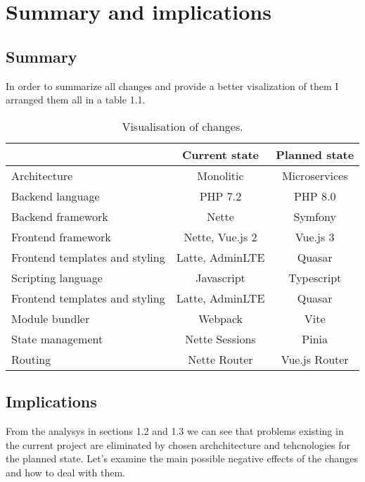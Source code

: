 \section{Summary and implications}

\subsection{Summary} 
In order to summarize all changes and provide a better visalization of them I arranged them all in a table 1.1.

\begin{table}[h]
\begin{tabular}{l|c|c|}
\textbf{}                                            & \textbf{Current state} & \textbf{Planned state} \\ \hline
\multicolumn{1}{|l|}{Architecture}                   & Monolitic              & Microservices          \\ \hline
\multicolumn{1}{|l|}{Backend language}               & PHP 7.2                & PHP 8.0                \\ \hline
\multicolumn{1}{|l|}{Backend framework}              & Nette                  & Symfony                \\ \hline
\multicolumn{1}{|l|}{Frontend framework}             & Nette, Vue.js 2        & Vue.js 3               \\ \hline
\multicolumn{1}{|l|}{Frontend templates and styling} & Latte, AdminLTE        & Quasar                 \\ \hline
\multicolumn{1}{|l|}{Scripting language}             & Javascript             & Typescript             \\ \hline
\multicolumn{1}{|l|}{Frontend templates and styling} & Latte, AdminLTE        & Quasar                 \\ \hline
\multicolumn{1}{|l|}{Module bundler}                 & Webpack                & Vite                   \\ \hline
\multicolumn{1}{|l|}{State management}               & Nette Sessions         & Pinia                  \\ \hline
\multicolumn{1}{|l|}{Routing}                        & Nette Router           & Vue.js Router          \\ \hline
\end{tabular}
\caption{\label{demo-table}Visualisation of changes.}
\end{table}

\subsection{Implications} From the analysys in sections 1.2 and 1.3 we can see that problems existing in the current project are eliminated by chosen archchitecture and tehcnologies for the planned state. Let's examine the main possible negative effects of the changes and how to deal with them.

